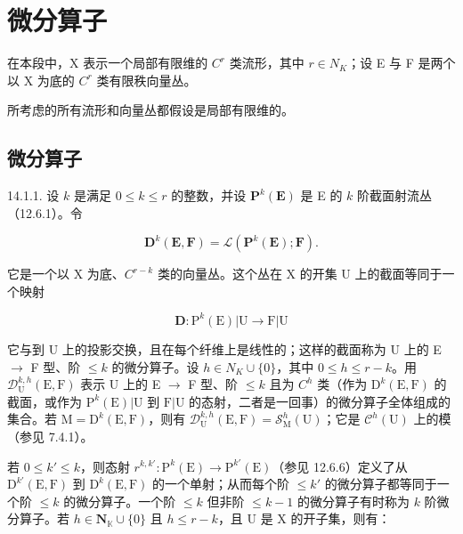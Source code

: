 \section{微分算子}

在本段中，X 表示一个局部有限维的 \(C^{r}\) 类流形，其中 \(r \in N_{K}\)；设 E 与 F 是两个以 X 为底的 \(C^{r}\) 类有限秩向量丛。

所考虑的所有流形和向量丛都假设是局部有限维的。

\subsection{微分算子}

14.1.1. 设 \(k\) 是满足 \(0 \leqslant k \leqslant r\) 的整数，并设 \(\mathbf{P}^k(\mathbf{E})\) 是 E 的 \(k\) 阶截面射流丛（12.6.1）。令

\[
\mathbf {D} ^ {k} (\mathbf {E}, \mathbf {F}) = \mathscr {L} (\mathbf {P} ^ {k} (\mathbf {E}); \mathbf {F}).
\]

它是一个以 X 为底、\(C^{r-k}\) 类的向量丛。这个丛在 X 的开集 U 上的截面等同于一个映射

\[
\mathbf {D}: \mathrm{P} ^ {k} (\mathrm{E}) | \mathrm{U} \rightarrow \mathrm{F} | \mathrm{U}
\]

它与到 U 上的投影交换，且在每个纤维上是线性的；这样的截面称为 U 上的 E \(\to\) F 型、阶 \(\leqslant k\) 的微分算子。设 \(h \in N_{K} \cup \{0\}\)，其中 \(0 \leqslant h \leqslant r-k\)。用 \(\mathcal{D}_{\mathrm{U}}^{k,h}(\mathrm{E}, \mathrm{F})\) 表示 U 上的 E \(\to\) F 型、阶 \(\leqslant k\) 且为 \(C^{h}\) 类（作为 \(\mathrm{D}^{k}(\mathrm{E}, \mathrm{F})\) 的截面，或作为 \(\mathrm{P}^{k}(\mathrm{E})|\mathrm{U}\) 到 \(\mathrm{F}|\mathrm{U}\) 的态射，二者是一回事）的微分算子全体组成的集合。若 \(\mathrm{M} = \mathrm{D}^{k}(\mathrm{E}, \mathrm{F})\)，则有 \(\mathcal{D}_{\mathrm{U}}^{k,h}(\mathrm{E}, \mathrm{F}) = \mathcal{S}_{\mathrm{M}}^{h}(\mathrm{U})\)；它是 \(\mathcal{C}^{h}(\mathrm{U})\) 上的模（参见 7.4.1）。

若 \(0 \leqslant k' \leqslant k\)，则态射 \(r^{k, k'}: \mathrm{P}^{k}(\mathrm{E}) \to \mathrm{P}^{k'}(\mathrm{E})\)（参见 12.6.6）定义了从 \(\mathrm{D}^{k'}(\mathrm{E}, \mathrm{F})\) 到 \(\mathrm{D}^{k}(\mathrm{E}, \mathrm{F})\) 的一个单射；从而每个阶 \(\leqslant k'\) 的微分算子都等同于一个阶 \(\leqslant k\) 的微分算子。一个阶 \(\leqslant k\) 但非阶 \(\leqslant k - 1\) 的微分算子有时称为 \(k\) 阶微分算子。若 \(h \in \mathbf{N}_{\mathbb{K}} \cup \{0\}\) 且 \(h \leqslant r - k\)，且 U 是 X 的开子集，则有：

